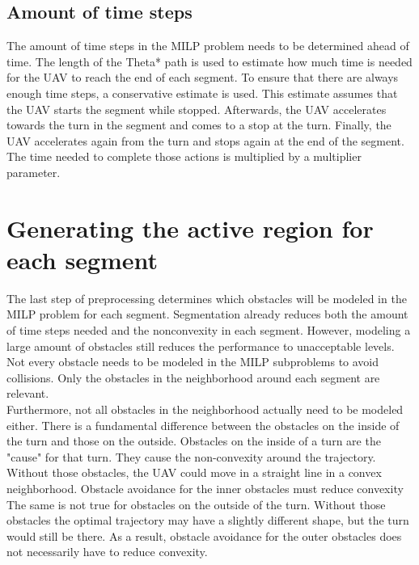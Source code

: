 %

\subsection{Amount of time steps}
The amount of time steps in the MILP problem needs to be determined ahead of time. The length of the Theta* path is used to estimate how much time is needed for the UAV to reach the end of each segment. To ensure that there are always enough time steps, a conservative estimate is used. This estimate assumes that the UAV starts the segment while stopped. Afterwards, the UAV accelerates towards the turn in the segment and comes to a stop at the turn. Finally, the UAV accelerates again from the turn and stops again at the end of the segment. The time needed to complete those actions is multiplied by a multiplier parameter.



\section{Generating the active region for each segment}
The last step of preprocessing determines which obstacles will be modeled in the MILP problem for each segment. Segmentation already reduces both the amount of time steps needed and the nonconvexity in each segment. However, modeling a large amount of obstacles still reduces the performance to unacceptable levels. \\
Not every obstacle needs to be modeled in the MILP subproblems to avoid collisions. Only the obstacles in the neighborhood around each segment are relevant. \\
Furthermore, not all obstacles in the neighborhood actually need to be modeled either. There is a fundamental difference between the obstacles on the inside of the turn and those on the outside. Obstacles on the inside of a turn are the "cause" for that turn. They cause the non-convexity around the trajectory. Without those obstacles, the UAV could move in a straight line in a convex neighborhood. Obstacle avoidance for the inner obstacles must reduce convexity\\
The same is not true for obstacles on the outside of the turn. Without those obstacles the optimal trajectory may have a slightly different shape, but the turn would still be there. As a result, obstacle avoidance for the outer obstacles does not necessarily have to reduce convexity. \\

